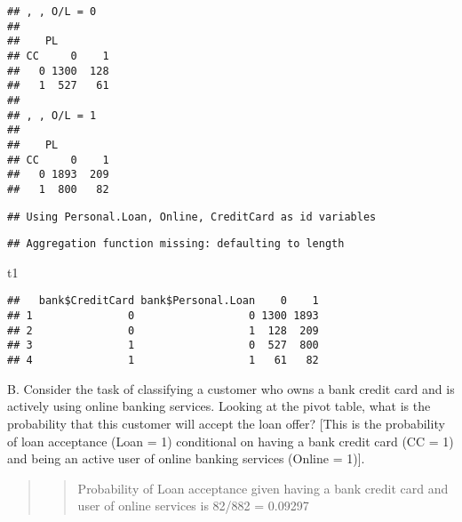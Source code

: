 \documentclass[
]{article}
\newenvironment{Shaded}{\begin{snugshade}}{\end{snugshade}}
\newcommand{\FunctionTok}[1]{\textcolor[rgb]{0.00,0.00,0.00}{#1}}
\newcommand{\NormalTok}[1]{#1}
\newcommand{\OtherTok}[1]{\textcolor[rgb]{0.56,0.35,0.01}{#1}}
\newcommand{\SpecialCharTok}[1]{\textcolor[rgb]{0.00,0.00,0.00}{#1}}
\begin{document}
\begin{verbatim}
## , , O/L = 0
## 
##    PL
## CC     0    1
##   0 1300  128
##   1  527   61
## 
## , , O/L = 1
## 
##    PL
## CC     0    1
##   0 1893  209
##   1  800   82
\end{verbatim}

\begin{Shaded}
\end{Shaded}

\begin{verbatim}
## Using Personal.Loan, Online, CreditCard as id variables
\end{verbatim}

\begin{verbatim}
## Aggregation function missing: defaulting to length
\end{verbatim}

\begin{Shaded}
\begin{Highlighting}[]
\NormalTok{t1}
\end{Highlighting}
\end{Shaded}

\begin{verbatim}
##   bank$CreditCard bank$Personal.Loan    0    1
## 1               0                  0 1300 1893
## 2               0                  1  128  209
## 3               1                  0  527  800
## 4               1                  1   61   82
\end{verbatim}

B. Consider the task of classifying a customer who owns a bank credit
card and is actively using online banking services. Looking at the pivot
table, what is the probability that this customer will accept the loan
offer? {[}This is the probability of loan acceptance (Loan = 1)
conditional on having a bank credit card (CC = 1) and being an active
user of online banking services (Online = 1){]}.

\begin{quote}
\begin{quote}
Probability of Loan acceptance given having a bank credit card and user
of online services is 82/882 = 0.09297
\end{quote}
\end{quote}
\end{document}
